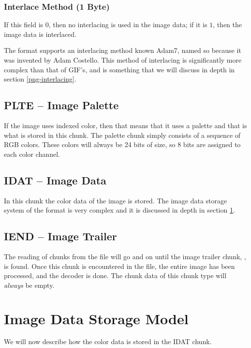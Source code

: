 \subsubsection*{Interlace Method (1 Byte)}

If this field is $0$, then no interlacing is used in the image data; if it
is $1$, then the image data is interlaced.

The \png format supports an interlacing method known Adam7, named so
because it was invented by Adam Costello. This method of interlacing
is significantly more complex than that of GIF's, and is something
that we will discuss in depth in section \ref{png-interlacing}.

\subsection{PLTE -- Image Palette}

If the image uses indexed color, then that means that it uses a
palette and that is what is stored in this chunk. The palette chunk
simply consists of a sequence of RGB colors. These colors will always be
24 bits of size, so 8 bits are assigned to each color channel.

\subsection{IDAT -- Image Data}

In this chunk the color data of the image is stored. The image data
storage system of the \png format is very complex and it is discussed
in depth in section \ref{sec:png-image-data-storage}.

\subsection{IEND -- Image Trailer}

The reading of chunks from the \png file will go and on until the image
trailer chunk, , is found. Once this chunk is encountered
in the file, the entire image has been processed, and the decoder is
done. The chunk data of this chunk type will \textit{always} be empty.

\section{Image Data Storage Model}
\label{sec:png-image-data-storage}

We will now describe how the color data is stored in the IDAT chunk.

